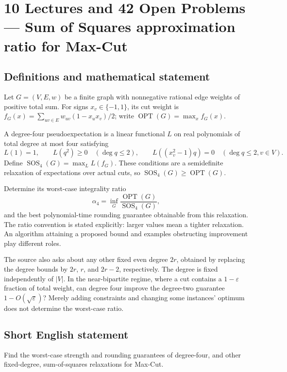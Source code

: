 \documentclass[11pt,a4paper]{article}
\begin{document}
\section*{10 Lectures and 42 Open Problems — Sum of Squares approximation ratio for Max-Cut}\label{statement}

\subsection{Definitions and mathematical statement}
Let $G=(V,E,w)$ be a finite graph with nonnegative rational edge weights
of positive total sum. For signs $x_v\in\{-1,1\}$, its cut weight is
$f_G(x)=\sum_{uv\in E}w_{uv}(1-x_ux_v)/2$; write
$\operatorname{OPT}(G)=\max_x f_G(x)$.

A degree-four pseudoexpectation is a linear functional $L$ on real
polynomials of total degree at most four satisfying
\[
 L(1)=1,\qquad L(q^2)\ge0\quad(\deg q\le2),\qquad
 L((x_v^2-1)q)=0\quad(\deg q\le2, v\in V).
\]
Define $\operatorname{SOS}_4(G)=\max_L L(f_G)$. These conditions are
a semidefinite relaxation of expectations over actual cuts, so
$\operatorname{SOS}_4(G)\ge\operatorname{OPT}(G)$.

Determine its worst-case integrality ratio
\[
       \alpha_4=\inf_G
             \frac{\operatorname{OPT}(G)}{\operatorname{SOS}_4(G)},
\]
and the best polynomial-time rounding guarantee obtainable from this
relaxation. The ratio convention is stated explicitly: larger values
mean a tighter relaxation. An algorithm attaining a proposed bound
and examples obstructing improvement play different roles.

The source also asks about any other fixed even degree $2r$, obtained
by replacing the degree bounds by $2r$, $r$, and $2r-2$, respectively.
The degree is fixed independently of $|V|$. In the near-bipartite
regime, where a cut contains a $1-\varepsilon$ fraction of total
weight, can degree four improve the degree-two guarantee
$1-O(\sqrt\varepsilon)$? Merely adding constraints and changing some
instances' optimum does not determine the worst-case ratio.
\subsection{Short English statement}
Find the worst-case strength and rounding guarantees of degree-four, and other fixed-degree, sum-of-squares relaxations for Max-Cut.
\end{document}
